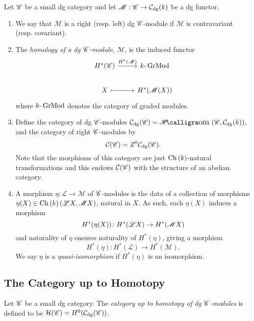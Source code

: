 \documentclass[dissertation.tex]{subfiles}
\begin{document}
\begin{defn}
  Let $\mathscr{C}$ be a small dg category and let $\mathscr{M} : \mathscr{C} \rightarrow \mathcal{C}_\text{dg}(k)$ be a dg functor.
  \begin{enumerate}
  \item
    We say that $\mathscr{M}$ is a right (resp. left) dg $\mathscr{C}$-module if $\mathscr{M}$ is contravariant (resp. covariant).
  \item
    The {\it homology of a dg $\mathscr{C}$-module}, $\mathscr{M}$, is the induced functor
    $$\begin{tikzcd}
      H^\ast(\CC) \arrow{r}{H^\ast(\mathscr{M})}& \Gr{k}\\
      X \arrow[mapsto]{r} & H^\ast(\mathscr{M}(X))
    \end{tikzcd}$$
    where $k\text{-}\operatorname{GrMod}$ denotes the category of graded modules.
  \item
    Define the category of dg $\mathscr{C}$-modules $\mathcal{C}_\text{dg}(\CC) = \SHom{\CC, \mathcal{C}_\text{dg}(k)}$, and the category of right $\mathscr{C}$-modules by
    $$\mathcal{C}(\mathscr{C}) = Z^0 \mathcal{C}_\text{dg}(\mathscr{C}).$$
    Note that the morphisms of this category are just $\operatorname{Ch}\left(k\right)$-natural transformations and this endows $\mathcal{C}(\mathscr{C})$ with the structure of an abelian category.
  \item
    A morphism $\eta \colon \mathscr{L} \rightarrow \mathscr{M}$ of $\mathscr{C}$-modules is the data of a collection of morphisms $\eta(X) \in \operatorname{Ch}\left(k\right)(\mathscr{L}X,\mathscr{M}X)$, natural in $X$.
    As such, each $\eta(X)$ induces a morphism
    $$H^\ast(\eta(X)) \colon H^\ast(\mathscr{L}X) \to H^\ast(\mathscr{M}X)$$
    and naturality of $\eta$ ensures naturality of $H^\ast(\eta)$, giving a morphism
    $$H^\ast(\eta) \colon H^\ast(\mathscr{L}) \rightarrow H^\ast(\mathscr{M}).$$
    We say $\eta$ is a {\it quasi-isomorphism} if $H^\ast(\eta)$ is an isomorphism.
  \end{enumerate}
\end{defn}

\subsection{The Category up to Homotopy}
\begin{defn}
  Let $\mathscr{C}$ be a small dg category.
  The {\it category up to homotopy of dg $\mathscr{C}$-modules} is defined to be $\mathcal{H}(\mathscr{C}) = H^0(\mathcal{C}_\text{dg}(\mathscr{C}))$.
\end{defn}
\end{document}
